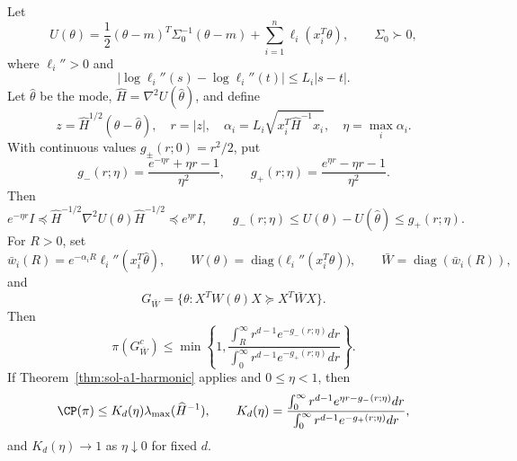 \documentclass[../main.tex]{subfiles}
\begin{document}
\begin{theorem}
\label{thm:sol-a1-mode-leverage}
Let
\[
 U(\theta)=\frac12(\theta-m)^T\Sigma_0^{-1}(\theta-m)
             +\sum_{i=1}^n\ell_i(x_i^T\theta),
 \qquad \Sigma_0\succ0,
\]
where $\ell_i''>0$ and
\[
 |\log\ell_i''(s)-\log\ell_i''(t)|\le L_i|s-t|.
\]
Let $\hat\theta$ be the mode, $\widehat H=\nabla^2U(\hat\theta)$, and define
\[
 z=\widehat H^{1/2}(\theta-\hat\theta),\quad r=|z|,\quad
 \alpha_i=L_i\sqrt{x_i^T\widehat H^{-1}x_i},\quad \eta=\max_i\alpha_i.
\]
With continuous values $g_\pm(r;0)=r^2/2$, put
\[
 g_-(r;\eta)=\frac{e^{-\eta r}+\eta r-1}{\eta^2},\qquad
 g_+(r;\eta)=\frac{e^{\eta r}-\eta r-1}{\eta^2}.
\]
Then
\[
 e^{-\eta r}I\preceq
 \widehat H^{-1/2}\nabla^2U(\theta)\widehat H^{-1/2}
 \preceq e^{\eta r}I,
 \qquad
 g_-(r;\eta)\le U(\theta)-U(\hat\theta)\le g_+(r;\eta).
\]
For $R>0$, set
\[
 \bar w_i(R)=e^{-\alpha_iR}\ell_i''(x_i^T\hat\theta),\qquad
 W(\theta)=\operatorname{diag}\big(\ell_i''(x_i^T\theta)\big),\qquad
 \bar W=\operatorname{diag}(\bar w_i(R)),
\]
and
\[
 G_{\bar W}=\{\theta:X^TW(\theta)X\succeq X^T\bar W X\}.
\]
Then
\begin{equation}\label{eq:sol-a1-tail}
 \pi(G_{\bar W}^c)\le
 \min\left\{1,
 \frac{\int_R^\infty r^{d-1}e^{-g_-(r;\eta)}dr}
      {\int_0^\infty r^{d-1}e^{-g_+(r;\eta)}dr}\right\}.
\end{equation}
If Theorem~\ref{thm:sol-a1-harmonic} applies and $0\le\eta<1$, then
\begin{equation}\label{eq:sol-a1-direct}
 \CP(\pi)\le K_d(\eta)\lambda_{\max}(\widehat H^{-1}),\qquad
 K_d(\eta)=
 \frac{\int_0^\infty r^{d-1}e^{\eta r-g_-(r;\eta)}dr}
      {\int_0^\infty r^{d-1}e^{-g_+(r;\eta)}dr},
\end{equation}
and $K_d(\eta)\to1$ as $\eta\downarrow0$ for fixed $d$.
\end{theorem}
\end{document}
